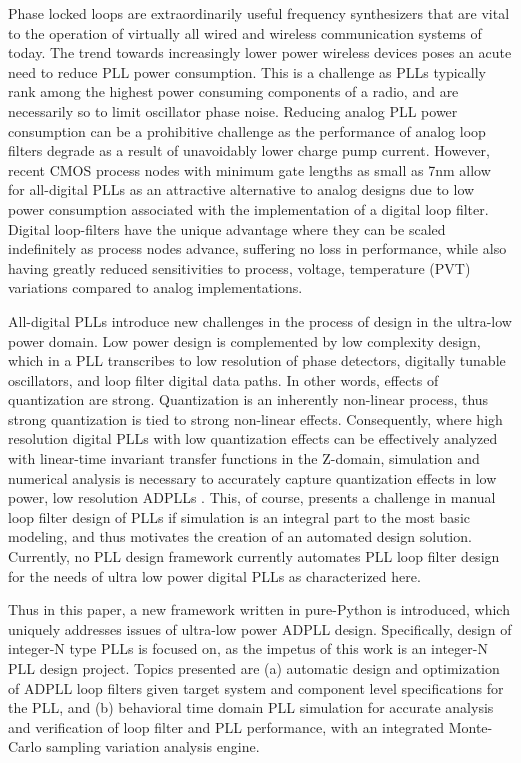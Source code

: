 Phase locked loops are extraordinarily useful frequency synthesizers that are vital to the operation of virtually all wired and wireless communication systems of today. The trend towards increasingly lower power wireless devices poses an acute need to reduce PLL power consumption. This is a challenge as PLLs typically rank among the highest power consuming components of a radio, and are necessarily so to limit oscillator phase noise. Reducing analog PLL power consumption can be a prohibitive challenge as the performance of analog loop filters degrade as a result of unavoidably lower charge pump current. However, recent CMOS process nodes with minimum gate lengths as small as 7nm allow for all-digital PLLs as an attractive alternative to analog designs due to low power consumption associated with the implementation of a digital loop filter. Digital loop-filters have the unique advantage where they can be scaled indefinitely as process nodes advance, suffering no loss in performance, while also having greatly reduced sensitivities to process, voltage, temperature (PVT) variations compared to analog implementations.

All-digital PLLs introduce new challenges in the process of design in the ultra-low power domain. Low power design is complemented by low complexity design, which in a PLL transcribes to low resolution of phase detectors, digitally tunable oscillators, and loop filter digital data paths. In other words, effects of quantization are strong. Quantization is an inherently non-linear process, thus strong quantization is tied to strong non-linear effects. Consequently, where high resolution digital PLLs with low quantization effects can be effectively analyzed with linear-time invariant transfer functions in the Z-domain, simulation and numerical analysis is necessary to accurately capture quantization effects in low power, low resolution ADPLLs . This, of course, presents a challenge in manual loop filter design of PLLs if simulation is an integral part to the most basic modeling, and thus motivates the creation of an automated design solution. Currently, no PLL design framework currently automates PLL loop filter design for the needs of ultra low power digital PLLs as characterized here.%

Thus in this paper, a new framework written in pure-Python is introduced, which uniquely addresses issues of ultra-low power ADPLL design. Specifically, design of integer-N type PLLs is focused on, as the impetus of this work is an integer-N PLL design project. Topics presented are (a) automatic design and optimization of ADPLL loop filters given target system and component level specifications for the PLL, and (b) behavioral time domain PLL simulation for accurate analysis and verification of loop filter and PLL performance, with an integrated Monte-Carlo sampling variation analysis engine.

